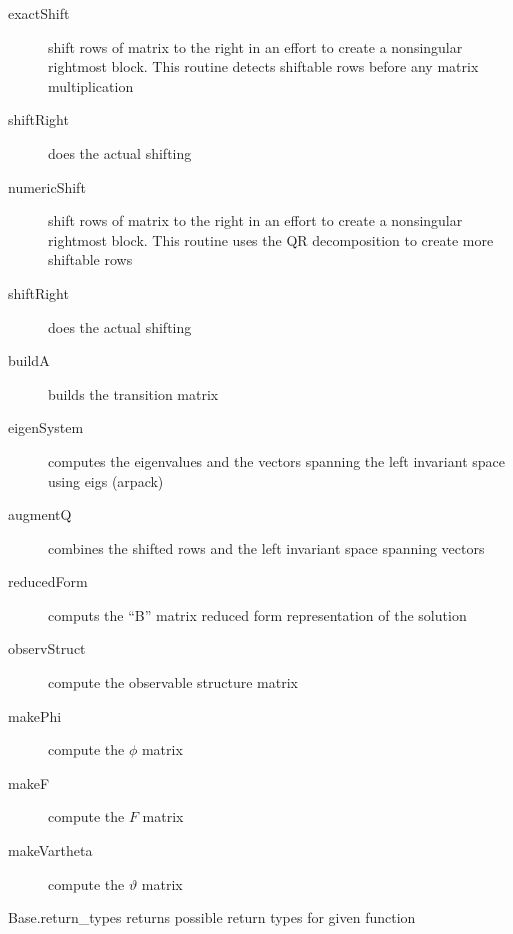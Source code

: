 \documentclass[12pt]{article}
\begin{document}
\begin{description}
\item[exactShift] shift rows of matrix to the right in an effort to create a nonsingular rightmost block. This routine detects shiftable rows before any matrix multiplication
\item[shiftRight]  does the actual shifting 
\item[numericShift] shift rows of matrix to the right in an effort to create a nonsingular rightmost block. This routine uses the QR decomposition to create  more shiftable rows
\item[shiftRight] does the actual shifting 
\item[buildA] builds the transition matrix
\item[eigenSystem] computes the eigenvalues and the vectors spanning the left invariant space using eigs (arpack)
\item[augmentQ] combines the shifted rows and the left invariant space spanning vectors
\item[reducedForm] computs the ``B'' matrix reduced form representation of the solution
\item[observStruct] compute the observable structure matrix
\item[makePhi] compute the $\phi$ matrix
\item[makeF] compute the  $F$ matrix
\item[makeVartheta] compute the  $\vartheta$ matrix



\end{description}

Base.return_types  returns possible return types for given function
\end{document}
